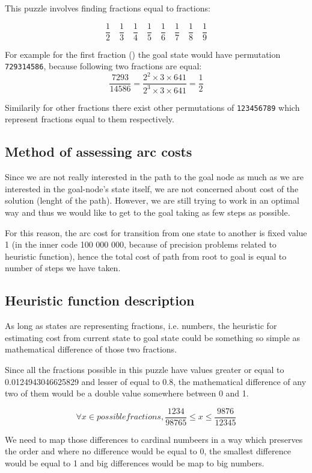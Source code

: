 \documentclass{article}
\begin{document}
This puzzle involves finding fractions equal to fractions: 

\[
 \frac{1}{2}\quad\frac{1}{3}\quad\frac{1}{4}\quad\frac{1}{5}\quad\frac{1}{6}\quad\frac{1}{7}\quad
 \frac{1}{8}\quad\frac{1}{9}
\]

For example for the first fraction () the goal state would have
permutation \texttt{729314586}, because following two fractions are equal:
\[\frac{7293}{14586} = \frac{2^2 \times 3 \times 641}{2^3 \times 3 \times 641} =
\frac{1}{2}\]

Similarily for other fractions there exist other permutations of
\texttt{123456789} which represent fractions equal to them respectively.

\subsection{Method of assessing arc costs}
Since we are not really interested in the path to the goal node as much as we
are interested in the goal-node's state itself, we are not concerned about cost
of the solution (lenght of the path). However, we are still trying to work in an
optimal way and thus we would like to get to the goal taking as few steps as
possible.

For this reason, the arc cost for transition from one state to another is fixed
value 1 (in the inner code 100 000 000, because of precision problems related to
heuristic function), hence the total cost of path from root to goal is equal to
number of steps we have taken.

\subsection{Heuristic function description}

As long as states are representing fractions, i.e. numbers, the heuristic
for estimating cost from current state to goal state could be something so
simple as mathematical difference of those two fractions.

Since all the fractions possible in this puzzle have values greater or equal to
0.0124943046625829 and lesser of equal to 0.8, the mathematical difference of
any two of them would be a double value somewhere between 0 and 1.

\[
 \forall x \in possible fractions, \frac{1234}{98765} \leq x \leq
 \frac{9876}{12345}
\]

We need to map those differences to cardinal numbeers in a way which preserves
the order and where no difference would be equal to 0, the smallest difference
would be equal to 1 and big differences would be map to big numbers.
\end{document}
